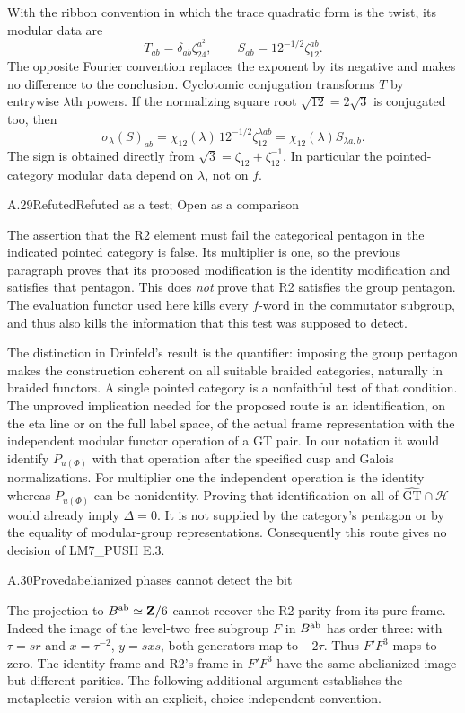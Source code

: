 With the ribbon convention in which the trace quadratic form is
the twist, its modular data are
\[
 T_{ab}=\delta_{ab}\zeta_{24}^{a^2},\qquad
 S_{ab}=12^{-1/2}\zeta_{12}^{ab}.
\]
The opposite Fourier convention replaces the exponent by its
negative and makes no difference to the conclusion.  Cyclotomic
conjugation transforms $T$ by entrywise $\lambda$th powers.  If the
normalizing square root $\sqrt{12}=2\sqrt3$ is conjugated too,
then
\[
 \sigma_\lambda(S)_{ab}
 =\chi_{12}(\lambda)\,12^{-1/2}\zeta_{12}^{\lambda ab}
 =\chi_{12}(\lambda)S_{\lambda a,b}.
\]
The sign is obtained directly from
$\sqrt3=\zeta_{12}+\zeta_{12}^{-1}$.
In particular the pointed-category modular data depend on
$\lambda$, not on $f$.

\begin{statement}{A.29}{Refuted}{Refuted as a test; Open as a comparison}
\end{statement}
The assertion that the R2 element must fail the categorical pentagon
in the indicated pointed category is false.  Its multiplier is one,
so the previous paragraph proves that its proposed modification is
the identity modification and satisfies that pentagon.
This does \emph{not} prove that R2 satisfies the group pentagon.
The evaluation functor used here kills every $f$-word in the
commutator subgroup, and thus also kills the information that this
test was supposed to detect.

The distinction in Drinfeld's result is the quantifier: imposing
the group pentagon makes the construction coherent on all suitable
braided categories, naturally in braided functors.  A single
pointed category is a nonfaithful test of that condition.  The
unproved implication needed for the proposed route is an
identification, on the eta line or on the full label space, of
the actual frame representation with the independent modular
functor operation of a GT pair.  In our notation it would identify
$P_{u(\Phi)}$ with that operation after the specified cusp and
Galois normalizations.  For multiplier one the independent operation
is the identity whereas $P_{u(\Phi)}$ can be nonidentity.  Proving
that identification on all of $\widehat{\mathrm{GT}}\cap\mathcal H$
would already imply $\Delta=0$.  It is not supplied by the
category's pentagon or by the equality of modular-group
representations.  Consequently this route gives no decision of
LM7\_PUSH E.3.

\begin{statement}{A.30}{Proved}{abelianized phases cannot detect the bit}
\end{statement}
The projection to $B^{\rm ab}\simeq\mathbf Z/6$ cannot recover the
R2 parity from its pure frame.  Indeed the image of the level-two
free subgroup $F$ in $B^{\rm ab}$ has order three: with
$\tau=sr$ and $x=\tau^{-2}$, $y=sxs$, both generators map to
$-2\tau$.  Thus $F'F^3$ maps to zero.  The identity frame and
R2's frame in $F'F^3$ have the same abelianized image but different
parities.  The following additional argument establishes the
metaplectic version with an explicit, choice-independent convention.

